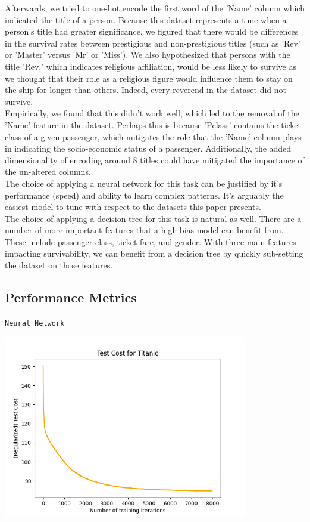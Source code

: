 \documentclass{article}
\begin{document}
Afterwards, we tried to one-hot encode the first word of the 'Name' column which indicated the title of a person. Because this dataset represents a time when a person's title had greater significance, we figured that there would be differences in the survival rates between prestigious and non-prestigious titles (such as 'Rev' or 'Master' versus 'Mr' or 'Miss').
We also hypothesized that persons with the title 'Rev,' which indicates religious affiliation, would be less likely to survive as we thought that their role as a religious figure would influence them to stay on the ship for longer than others. Indeed, every reverend in the dataset did not survive.
\\

Empirically, we found that this didn't work well, which led to the removal of the 'Name' feature in the dataset.
Perhaps this is because 'Pclass' contains the ticket class of a given passenger, which mitigates the role that the 'Name' column plays in indicating the socio-economic status of a passenger. Additionally,
the added dimensionality of encoding around 8 titles could have mitigated the importance of the un-altered columns.
\\

The choice of applying a neural network for this task can be justified by it's performance (speed) and ability to learn complex patterns. 
It's arguably the easiest model to tune with respect to the datasets this paper presents.
\\

The choice of applying a decision tree for this task is natural as well. There are a number of more important features that a high-bias model can benefit from. These
include passenger class, ticket fare, and gender. With three main features impacting survivability, we can benefit from a decision tree by quickly sub-setting the dataset on those features.

\newpage
\subsection*{Performance Metrics}
\begin{center}
    \texttt{Neural Network}

    \includegraphics*[width=0.8\textwidth]{./src/figures/Titanic-test-cost.png}
\end{center}
\end{document}
